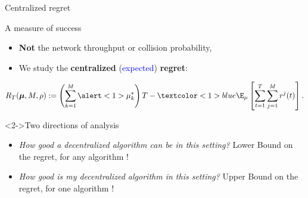 \begin{frame}{Centralized regret}

\begin{block}{A measure of success}

\begin{itemize}\tightlist
\item
  \textbf<1>{Not} the network throughput or collision probability,
\item
  We study the \textbf<1>{centralized} (\textcolor<1>{blue}{expected}) \textbf<1>{regret}:
\end{itemize}

\begin{small}\vspace*{-10pt}
  $$R_T(\boldsymbol{\mu}, M, \rho)
  :=
  \left(\sum_{k=1}^{M}\alert<1>{\mu_k^*}\right) T - \textcolor<1>{blue}{\E_{\mu}}\left[\sum_{t=1}^T\sum_{j=1}^M r^j(t) \right].$$
\end{small}

\vspace*{-10pt}

\end{block}


\begin{block}<2->{Two directions of analysis}

\begin{itemize}\tightlist
\item<2->
  \emph{How good a decentralized algorithm can be in this setting?}
  \hook{} \alert{Lower Bound} on the regret, for \alert{any} algorithm !
\item<2->
  \emph{How good is my decentralized algorithm in this setting?}
  \hook{} \alert{Upper Bound} on the regret, for \alert{one} algorithm !
\end{itemize}

\end{block}

\end{frame}



